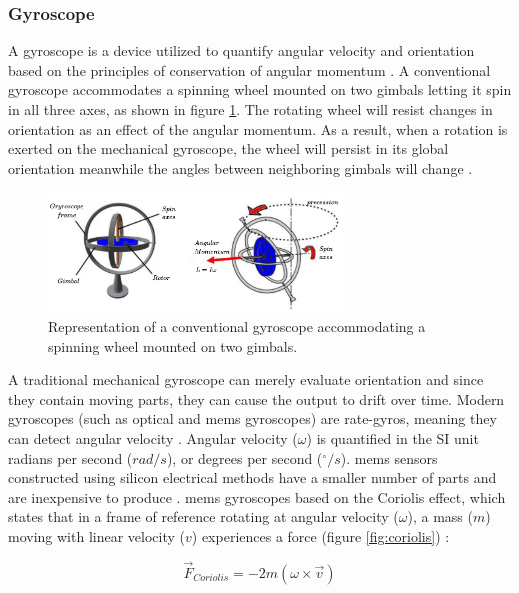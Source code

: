 \subsubsection{Gyroscope}

A gyroscope is a device utilized to quantify angular velocity and orientation based on the principles of conservation of angular momentum \cite{zhuang2020introductory}. A conventional gyroscope accommodates a spinning wheel mounted on two gimbals letting it spin in all three axes, as shown in figure \ref{fig:gyroscope}. The rotating wheel will resist changes in orientation as an effect of the angular momentum. As a result, when a rotation is exerted on the mechanical gyroscope, the wheel will persist in its global orientation meanwhile the angles between neighboring gimbals will change \cite{marotto2013orientation}.

\begin{figure}[!h]
    \centering
    \includegraphics[width=0.7\textwidth]{figures/gyroscope.pdf}
    \caption{ Representation of a conventional gyroscope accommodating a spinning wheel mounted on two gimbals. \cite{marotto2013orientation} }
    \label{fig:gyroscope}
\end{figure}

A traditional mechanical gyroscope can merely evaluate orientation and since they contain moving parts, they can cause the output to drift over time. Modern gyroscopes (such as optical and \acrshort{mems} gyroscopes) are rate-gyros, meaning they can detect angular velocity \cite{antonello2011mems}. Angular velocity ($\omega$) is quantified in the SI unit radians per second ($rad/s$), or degrees per second ($^{\circ}/s$). \acrshort{mems} sensors constructed using silicon electrical methods have a smaller number of parts and are inexpensive to produce \cite{antonello2012exploring}. \acrshort{mems} gyroscopes based on the Coriolis effect, which states that in a frame of reference rotating at angular velocity ($\omega$), a mass ($m$) moving with linear velocity ($v$) experiences a force (figure \ref{fig:coriolis}) \cite{trusov2011overview}:

\begin{equation}
    \overrightarrow{F}_{Coriolis} = -2m(\omega \times \overrightarrow{v} )
\end{equation}


